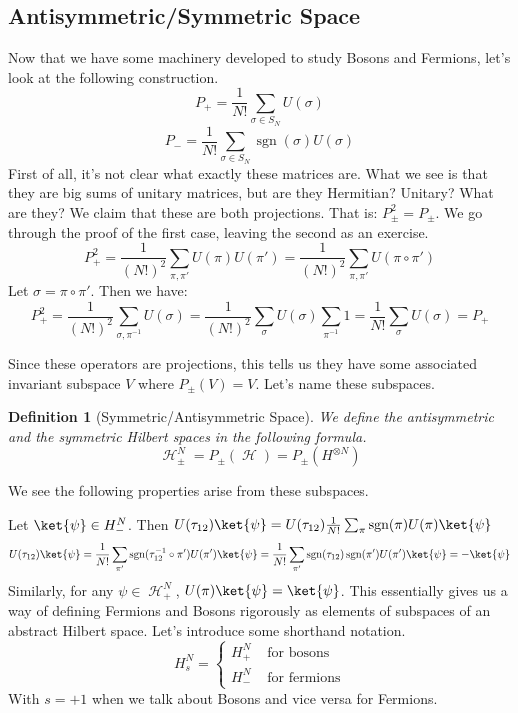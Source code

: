 \documentclass{article}
\DeclareMathOperator{\Hh}{{\mathcal{H}}}
\DeclareMathOperator{\sgn}{\textrm{sgn}}
\newtheorem{defn}{Definition}
\begin{document}
\subsection{Antisymmetric/Symmetric Space}
Now that we have some machinery developed to study Bosons and Fermions, let's look at the following construction.
\begin{equation}
P_{+} = \frac{1}{N!}\sum_{\sigma \in S_N} U(\sigma)
\end{equation}
\begin{equation}
P_{-} = \frac{1}{N!}\sum_{\sigma \in S_N} \sgn(\sigma) U(\sigma)
\end{equation}
First of all, it's not clear what exactly these matrices are. What we see is that they are big sums of unitary matrices, but are they Hermitian? Unitary? What are they? We claim that these are both projections. That is: $P_{\pm}^2 = P_{\pm}$. We go through the proof of the first case, leaving the second as an exercise.
\[P_+^2 = \frac{1}{(N!)^2} \sum_{\pi,\pi'}U(\pi)U(\pi') = \frac{1}{(N!)^2}\sum_{\pi,\pi'} U(\pi \circ \pi')\]
Let $\sigma = \pi\circ \pi'$. Then we have:
\[P_+^2 = \frac{1}{(N!)^2} \sum_{\sigma,\pi^{-1}}U(\sigma) = \frac{1}{(N!)^2}\sum_{\sigma}U(\sigma) \sum_{\pi^{-1}}1 = \frac{1}{N!}\sum_{\sigma} U(\sigma) = P_+\]

Since these operators are projections, this tells us they have some associated invariant subspace $V$ where $P_\pm (V) = V$. Let's name these subspaces.
\begin{defn}[Symmetric/Antisymmetric Space]
We define the antisymmetric and the symmetric Hilbert spaces in the following formula.
\begin{equation}
\Hh_\pm^N = P_\pm(\Hh) = P_\pm(H^{\otimes N})
\end{equation}
\end{defn}
We see the following properties arise from these subspaces. 

Let $\ket{\psi} \in H_-^N$. Then $U(\tau_{12}) \ket{\psi} = U(\tau_{12}) \frac{1}{N!}\sum_{\pi}\sgn(\pi)U(\pi) \ket{\psi}$
\[U(\tau_{12})\ket{\psi} = \frac{1}{N!}\sum_{\pi'}\sgn(\tau_{12}^{-1}\circ \pi')U(\pi') \ket{\psi} = \frac{1}{N!}\sum_{\pi'}\sgn(\tau_{12})\sgn(\pi')U(\pi')\ket{\psi}=-\ket{\psi}\] Similarly, for any $\psi \in \Hh_+^N$, $U(\pi)\ket{\psi} = \ket{\psi}$. This essentially gives us a way of defining Fermions and Bosons rigorously as elements of subspaces of an abstract Hilbert space. Let's introduce some shorthand notation.
\[H_s^N = \begin{cases}H_+^N & \textrm{ for bosons} \\ H_-^N & \textrm{ for fermions}\end{cases}\]
With $s = +1$ when we talk about Bosons and vice versa for Fermions.
\end{document}
